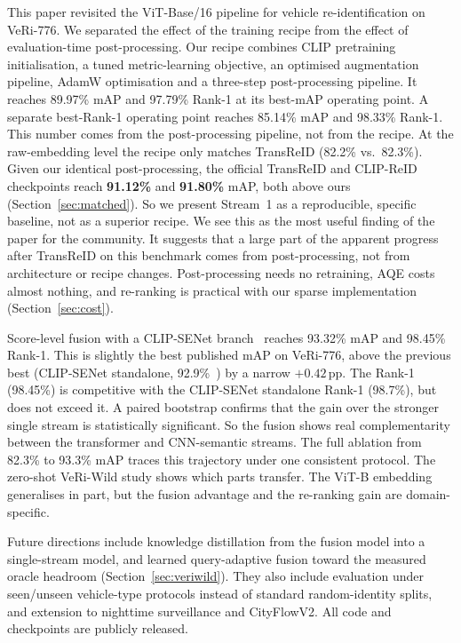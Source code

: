 This paper revisited the ViT-Base/16 pipeline for vehicle re-identification on VeRi-776. We separated the effect of the training recipe from the effect of evaluation-time post-processing. Our recipe combines CLIP pretraining initialisation, a tuned metric-learning objective, an optimised augmentation pipeline, AdamW optimisation and a three-step post-processing pipeline. It reaches 89.97\% mAP and 97.79\% Rank-1 at its best-mAP operating point. A separate best-Rank-1 operating point reaches 85.14\% mAP and 98.33\% Rank-1. This number comes from the post-processing pipeline, not from the recipe. At the raw-embedding level the recipe only matches TransReID (82.2\% vs.\ 82.3\%). Given our identical post-processing, the official TransReID and CLIP-ReID checkpoints reach \textbf{91.12\%} and \textbf{91.80\%} mAP, both above ours (Section~\ref{sec:matched}). So we present Stream~1 as a reproducible, specific baseline, not as a superior recipe. We see this as the most useful finding of the paper for the community. It suggests that a large part of the apparent progress after TransReID on this benchmark comes from post-processing, not from architecture or recipe changes. Post-processing needs no retraining, AQE costs almost nothing, and re-ranking is practical with our sparse implementation (Section~\ref{sec:cost}).

Score-level fusion with a CLIP-SENet branch~\cite{lu2025clipsenet} reaches 93.32\% mAP and 98.45\% Rank-1. This is slightly the best published mAP on VeRi-776, above the previous best (CLIP-SENet standalone, 92.9\%~\cite{lu2025clipsenet}) by a narrow $+0.42$\,pp. The Rank-1 (98.45\%) is competitive with the CLIP-SENet standalone Rank-1 (98.7\%), but does not exceed it. A paired bootstrap confirms that the gain over the stronger single stream is statistically significant. So the fusion shows real complementarity between the transformer and CNN-semantic streams. The full ablation from 82.3\% to 93.3\% mAP traces this trajectory under one consistent protocol. The zero-shot VeRi-Wild study shows which parts transfer. The ViT-B embedding generalises in part, but the fusion advantage and the re-ranking gain are domain-specific.

Future directions include knowledge distillation from the fusion model into a single-stream model, and learned query-adaptive fusion toward the measured oracle headroom (Section~\ref{sec:veriwild}). They also include evaluation under seen/unseen vehicle-type protocols instead of standard random-identity splits, and extension to nighttime surveillance and CityFlowV2. All code and checkpoints are publicly released.
